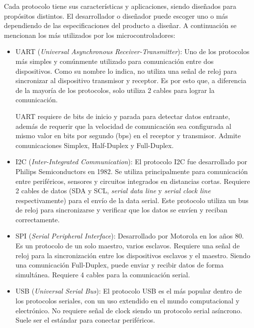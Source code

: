 Cada protocolo tiene sus características y aplicaciones, siendo diseñados para propósitos distintos. El desarrollador o diseñador puede escoger uno o más dependiendo de las especificaciones del producto a diseñar. A continuación se mencionan los más utilizados por los microcontroladores:

\begin{itemize}
    \item UART (\textit{Universal Asynchronous Receiver-Transmitter}): Uno de los protocolos más simples y comúnmente utilizado para comunicación entre dos dispositivos. Como su nombre lo indica, no utiliza una señal de reloj para sincronizar al dispositivo transmisor y receptor. Es por esto que, a diferencia de la mayoría de los protocolos, solo utiliza 2 cables para lograr la comunicación.
    
    UART requiere de bits de inicio y parada para detectar datos entrante, además de requerir que la velocidad de comunicación sea configurada al mismo valor en bits por segundo (bps) en el receptor y transmisor. Admite comunicaciones Simplex, Half-Duplex y Full-Duplex.
 
    \item I2C (\textit{Inter-Integrated Communication}):  El protocolo I2C fue desarrollado por Philips Semiconductors en 1982. Se utiliza principalmente para comunicación entre periféricos, sensores y circuitos integrados en distancias cortas. Requiere 2 cables de datos (SDA y SCL, \textit{serial data line} y \textit{serial clock line} respectivamente) para el envío de la data serial. Este protocolo utiliza un bus de reloj para sincronizarse y verificar que los datos se envíen y reciban correctamente.
    
    \item SPI (\textit{Serial Peripheral Interface}): Desarrollado por Motorola en los años 80. Es un protocolo de un solo maestro, varios esclavos. Requiere una señal de reloj para la sincronización entre los dispositivos esclavos y el maestro. Siendo una comunicación Full-Duplex, puede enviar y recibir datos de forma simultánea. Requiere 4 cables para la comunicación serial.

    \item USB (\textit{Universal Serial Bus}): El protocolo USB es el más popular dentro de los protocolos seriales, con un uso extendido en el mundo computacional y electrónico. No requiere señal de clock siendo un protocolo serial asíncrono. Suele ser el estándar para conectar periféricos.
    
\end{itemize}

